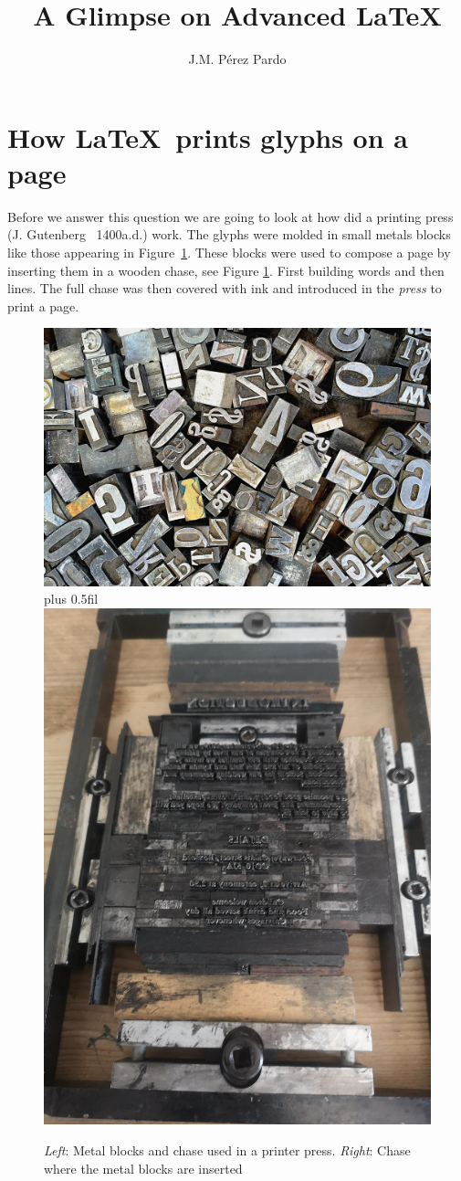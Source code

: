 \documentclass[a4paper]{article}
\title{A Glimpse on Advanced \LaTeX{}}
\author{J.M. Pérez Pardo}
\date{}
\begin{document}
\maketitle

\tableofcontents

\section{How \LaTeX\ prints glyphs on a page}

Before we answer this question we are going to look at how did a printing press (J. Gutenberg ~1400a.d.) work. The glyphs were molded in small metals blocks like those appearing in Figure~\ref{fig:metalblockschase}. These blocks were used to compose a page by inserting them in a wooden chase, see Figure \ref{fig:metalblockschase}. First building words and then lines. The full chase was then covered with ink and introduced in the \emph{press} to print a page.
%
\begin{figure}[h]
  \hfil\vbox{ \hbox{\includegraphics[width=.5\textwidth]{glympse_figures/metal_blocks.jpg}} \vspace{1cm}}\hskip 0pt plus 0.5fil \includegraphics[width=.4\textwidth]{glympse_figures/chase.jpg}\hfil
  \caption{\emph{Left}: Metal blocks and chase used in a printer press. \emph{Right}: Chase where the metal blocks are inserted}\label{fig:metalblockschase}
\end{figure}
%
\end{document}
